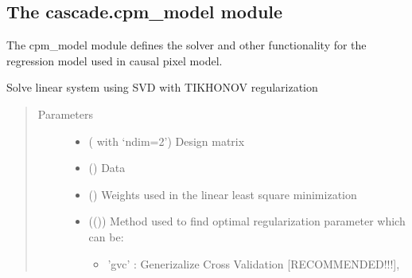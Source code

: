 \documentclass[a4paper,10pt,english]{sphinxmanual}
\begin{document}
\subsection{The cascade.cpm\_model module}
\label{\detokenize{cascade.cpm_model:module-cascade.cpm_model.cpm_model}}\label{\detokenize{cascade.cpm_model:the-cascade-cpm-model-module}}\label{\detokenize{cascade.cpm_model::doc}}
The cpm\_model module defines the solver and other functionality for the
regression model used in causal pixel model.

\begin{fulllineitems}
\label{\detokenize{cascade.cpm_model:cascade.cpm_model.cpm_model.solve_linear_equation}}
Solve linear system using SVD with TIKHONOV regularization
\begin{quote}\begin{description}
\item[{Parameters}] \leavevmode\begin{itemize}
\item {} 
 ( with ‘ndim=2’) \textendash{} Design matrix

\item {} 
 () \textendash{} Data

\item {} 
 () \textendash{} Weights used in the linear least square minimization

\item {} 
 (()) \textendash{} 
Method used to find optimal regularization parameter which can be:
\begin{itemize}
\item {} 
’gvc’ :  Generizalize Cross Validation {[}RECOMMENDED!!!{]},


\end{itemize}
\end{itemize}
\end{description}
\end{quote}
\end{fulllineitems}
\end{document}

